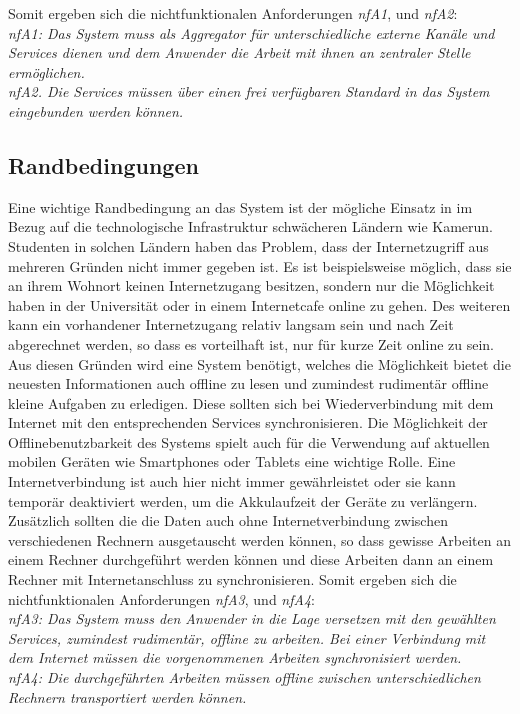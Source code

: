 Somit ergeben sich die nichtfunktionalen Anforderungen \emph{nfA1}, und \emph{nfA2}:\\
\emph{nfA1: Das System muss als Aggregator für unterschiedliche externe Kanäle und Services dienen und dem Anwender die Arbeit mit ihnen an zentraler Stelle ermöglichen.}\\
\emph{nfA2. Die Services müssen über einen frei verfügbaren Standard in das System eingebunden werden können.}

\subsection{Randbedingungen}
Eine wichtige Randbedingung an das System ist der mögliche Einsatz in im Bezug auf die technologische Infrastruktur schwächeren Ländern wie Kamerun. Studenten in solchen Ländern  haben das Problem, dass der Internetzugriff aus mehreren Gründen nicht immer gegeben ist. Es ist beispielsweise möglich, dass sie an ihrem Wohnort keinen Internetzugang besitzen, sondern nur die Möglichkeit haben in der Universität oder in einem Internetcafe online zu gehen. Des weiteren kann ein vorhandener Internetzugang relativ langsam sein und nach Zeit abgerechnet werden, so dass es vorteilhaft ist, nur für kurze Zeit online zu sein. Aus diesen Gründen wird eine System benötigt, welches die Möglichkeit bietet die neuesten Informationen auch offline zu lesen und zumindest rudimentär offline kleine Aufgaben zu erledigen. Diese sollten sich bei Wiederverbindung mit dem Internet mit den entsprechenden Services synchronisieren. Die Möglichkeit der Offlinebenutzbarkeit des Systems spielt auch für die Verwendung auf aktuellen mobilen Geräten wie Smartphones oder Tablets eine wichtige Rolle. Eine Internetverbindung ist auch hier nicht immer gewährleistet oder sie kann temporär deaktiviert werden, um die Akkulaufzeit der Geräte zu verlängern. 
Zusätzlich sollten die die Daten auch ohne Internetverbindung zwischen verschiedenen Rechnern ausgetauscht werden können, so dass gewisse Arbeiten an einem Rechner durchgeführt werden können und diese Arbeiten dann an einem Rechner mit Internetanschluss zu synchronisieren.
Somit ergeben sich die nichtfunktionalen Anforderungen \emph{nfA3}, und \emph{nfA4}:\\
\emph{nfA3: Das System muss den Anwender in die Lage versetzen mit den gewählten Services, zumindest rudimentär, offline zu arbeiten. Bei einer Verbindung mit dem Internet müssen die vorgenommenen Arbeiten synchronisiert werden.}\\
\emph{nfA4: Die durchgeführten Arbeiten müssen offline zwischen unterschiedlichen Rechnern transportiert werden können.}

